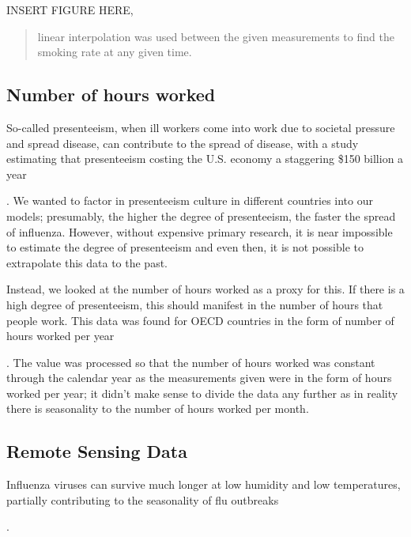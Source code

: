 \documentclass[letterpaper,10pt,english]{sphinxmanual}
\begin{document}
INSERT FIGURE HERE,
\begin{quote}

linear interpolation was used between the given measurements to find the smoking rate at any given time.
\end{quote}


\subsection{Number of hours worked}
\label{\detokenize{datasets:number-of-hours-worked}}
So-called presenteeism, when ill workers come into work due to societal pressure and spread disease, can contribute to the spread of disease, with a study estimating that presenteeism costing the U.S. economy a staggering \$150 billion a year %
\begin{footnote}[5]\sphinxAtStartFootnote
{}
%
\end{footnote}. We wanted to factor in presenteeism culture in different countries into our models; presumably, the higher the degree of presenteeism, the faster the spread of influenza. However, without expensive primary research, it is near impossible to estimate the degree of presenteeism and even then, it is not possible to extrapolate this data to the past.

Instead, we looked at the number of hours worked as a proxy for this. If there is a high degree of presenteeism, this should manifest in the number of hours that people work. This data was found for OECD countries in the form of number of hours worked per year %
\begin{footnote}[6]\sphinxAtStartFootnote
{}
%
\end{footnote}. The value was processed so that the number of hours worked was constant through the calendar year as the measurements given were in the form of hours worked per year; it didn’t make sense to divide the data any further as in reality there is seasonality to the number of hours worked per month.


\subsection{Remote Sensing Data}
\label{\detokenize{datasets:remote-sensing-data}}
Influenza viruses can survive much longer at low humidity and low temperatures, partially contributing to the seasonality of flu outbreaks %
\begin{footnote}[7]\sphinxAtStartFootnote
{}
%
\end{footnote}.
\end{document}
